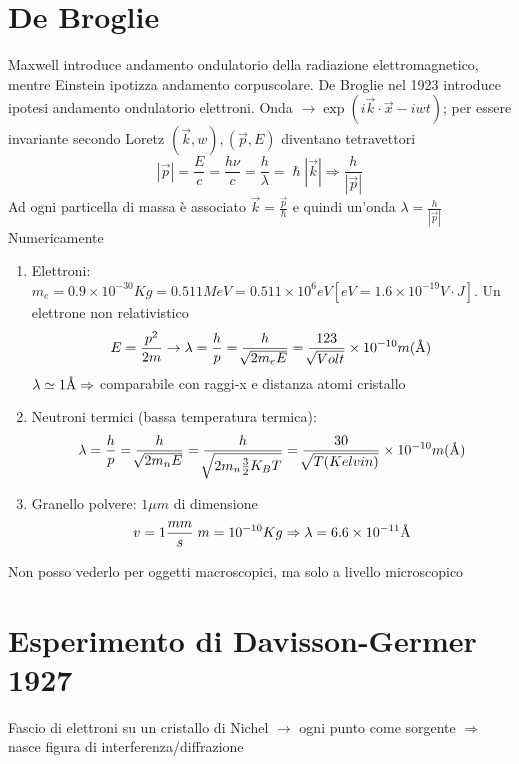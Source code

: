 \section{De Broglie}
Maxwell introduce andamento ondulatorio della radiazione elettromagnetico, mentre Einstein ipotizza andamento corpuscolare. De Broglie nel 1923 introduce ipotesi andamento ondulatorio elettroni. \newline
Onda $\rightarrow \exp(i \vec{k}\cdot \vec{x}- iwt)$; per essere invariante secondo Loretz $(\vec{k},w),(\vec{p},E)$ diventano tetravettori
\begin{equation*}
    |\vec{p}| = \frac{E}{c} = \frac{h\nu}{c} = \frac{h}{\lambda} = \hslash |\vec{k}| \Rightarrow \frac{h}{|\vec{p}|}
\end{equation*}
Ad ogni particella di massa è associato $\vec{k} = \frac{\vec{p}}{\hslash}$ e quindi un'onda $\lambda = \frac{h}{|\vec{p}|}$ \newline
Numericamente
\begin{enumerate}
    \item Elettroni: $m_e = 0.9 \times 10^{-30} Kg = 0.511 MeV = 0.511 \times 10^6 eV [eV = 1.6 \times 10^{-19} V\cdot J]$. Un elettrone non relativistico
    \begin{equation*}
        E = \frac{p^2}{2m} \rightarrow \lambda = \frac{h}{p} = \frac{h}{\sqrt[]{2m_eE}} = \frac{123}{\sqrt[]{Volt}}\times 10^{-10} m (\text{\AA})
    \end{equation*}
    $\lambda \simeq 1 \text{\AA} \Rightarrow$ comparabile con raggi-x e distanza atomi cristallo
    \item Neutroni termici (bassa temperatura termica): 
    \begin{equation*}
        \lambda = \frac{h}{p} = \frac{h}{\sqrt[]{2m_nE}} = \frac{h}{\sqrt[]{2m_n \frac{3}{2}K_BT}} =\frac{30}{\sqrt[]{T (Kelvin)}}\times 10^{-10} m (\text{\AA})
    \end{equation*}
    \item Granello polvere: $1\mu m$ di dimensione 
    \begin{equation*}
        v = 1 \frac{mm}{s} \; m = 10^{-10} Kg \Rightarrow \lambda = 6.6 \times 10^{-11} \text{\AA} 
    \end{equation*}
\end{enumerate} 
Non posso vederlo per oggetti macroscopici, ma solo a livello microscopico

\section*{Esperimento di Davisson-Germer 1927}
Fascio di elettroni su un cristallo di Nichel $\rightarrow$ ogni punto come sorgente $\Rightarrow$ nasce figura di interferenza/diffrazione 
